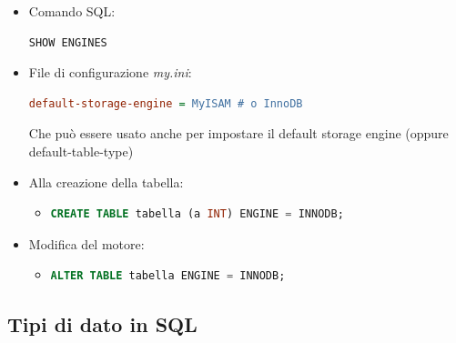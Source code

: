\begin{itemize}

\item Comando SQL:

\begin{lstlisting}[language=SQL]
SHOW ENGINES
\end{lstlisting}

\item File di configurazione \textit{my.ini}:

\begin{lstlisting}[language=Ini]
default-storage-engine = MyISAM # o InnoDB
\end{lstlisting}

Che può essere usato anche per impostare il default storage engine
(oppure default-table-type)

\item Alla creazione della tabella:

\begin{itemize}
\item
\begin{lstlisting}[language=SQL]
CREATE TABLE tabella (a INT) ENGINE = INNODB;
\end{lstlisting}
\end{itemize}

\item Modifica del motore:

\begin{itemize}
\item
\begin{lstlisting}[language=SQL]
ALTER TABLE tabella ENGINE = INNODB;
\end{lstlisting}
\end{itemize}
\end{itemize}

\subsection{Tipi di dato in SQL}

